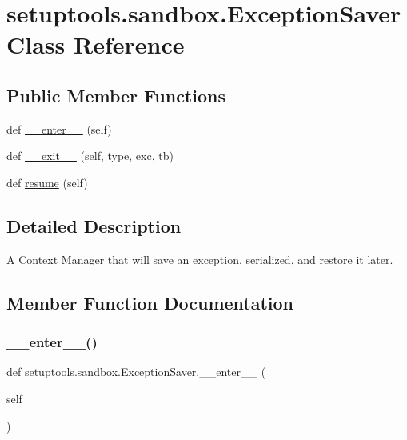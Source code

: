 \hypertarget{classsetuptools_1_1sandbox_1_1ExceptionSaver}{}\section{setuptools.\+sandbox.\+Exception\+Saver Class Reference}
\label{classsetuptools_1_1sandbox_1_1ExceptionSaver}
\subsection*{Public Member Functions}
\begin{DoxyCompactItemize}
\item 
def \hyperlink{classsetuptools_1_1sandbox_1_1ExceptionSaver_ad082d945975f60464d10fc094badb716}{\+\_\+\+\_\+enter\+\_\+\+\_\+} (self)
\item 
def \hyperlink{classsetuptools_1_1sandbox_1_1ExceptionSaver_adb9641f6636f79990953e8e801042e48}{\+\_\+\+\_\+exit\+\_\+\+\_\+} (self, type, exc, tb)
\item 
def \hyperlink{classsetuptools_1_1sandbox_1_1ExceptionSaver_a15ad2160616d79097aeb70eb725a0172}{resume} (self)
\end{DoxyCompactItemize}


\subsection{Detailed Description}
\begin{DoxyVerb}A Context Manager that will save an exception, serialized, and restore it
later.
\end{DoxyVerb}
 

\subsection{Member Function Documentation}
\mbox{\label{classsetuptools_1_1sandbox_1_1ExceptionSaver_ad082d945975f60464d10fc094badb716}} 
\subsubsection{\texorpdfstring{\+\_\+\+\_\+enter\+\_\+\+\_\+()}{\_\_enter\_\_()}}
{\footnotesize\ttfamily def setuptools.\+sandbox.\+Exception\+Saver.\+\_\+\+\_\+enter\+\_\+\+\_\+ (\begin{DoxyParamCaption}\item[{}]{self }\end{DoxyParamCaption})}

